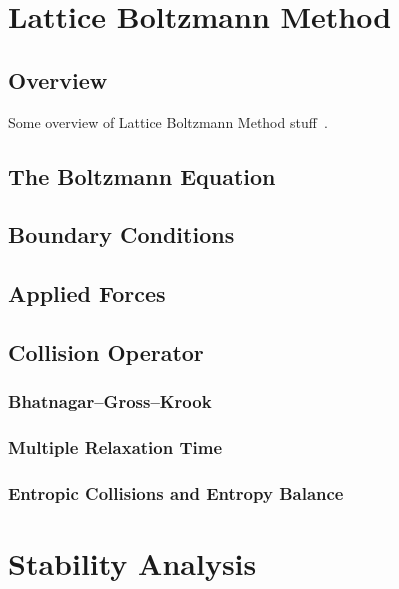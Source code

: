 \documentclass{article}
\begin{document}
\section{Lattice Boltzmann Method}

\subsection{Overview}

Some overview of Lattice Boltzmann Method stuff~\cite{grasinger2015simulation}.

\subsection{The Boltzmann Equation}

\subsection{Boundary Conditions}

\subsection{Applied Forces}

\subsection{Collision Operator} %

\subsubsection{Bhatnagar--Gross--Krook}

\subsubsection{Multiple Relaxation Time}

\subsubsection{Entropic Collisions and Entropy Balance}

\section{Stability Analysis}
\end{document}
